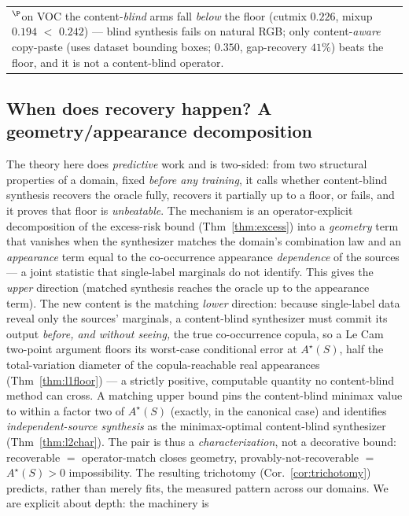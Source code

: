 \documentclass[11pt]{article}
\begin{document}
\begin{table}[t]
\begin{tabular}{lcccc}
\multicolumn{5}{l}{\footnotesize $^{\P}$on VOC the content-\emph{blind} arms fall \emph{below} the floor (cutmix $0.226$, mixup $0.194$ $<$ $0.242$) --- blind synthesis fails on natural RGB; only content-\emph{aware} copy-paste (uses dataset bounding boxes; $0.350$, gap-recovery $41\%$) beats the floor, and it is not a content-blind operator.}
\end{tabular}
\end{table}

\subsection{When does recovery happen? A geometry/appearance decomposition}\label{sec:theory}

The theory here does \emph{predictive} work and is two-sided: from two structural properties of
a domain, fixed \emph{before any training}, it calls whether content-blind synthesis recovers the
oracle fully, recovers it partially up to a floor, or fails, and it proves that floor is
\emph{unbeatable}. The mechanism is an operator-explicit decomposition of the excess-risk bound
(Thm~\ref{thm:excess}) into a \emph{geometry} term that vanishes when the synthesizer matches the
domain's combination law and an \emph{appearance} term equal to the co-occurrence appearance
\emph{dependence} of the sources --- a joint statistic that single-label marginals do not
identify. This gives the \emph{upper} direction (matched synthesis reaches the oracle up to the
appearance term). The new content is the matching \emph{lower} direction: because single-label
data reveal only the sources' marginals, a content-blind synthesizer must commit its output
\emph{before, and without seeing,} the true co-occurrence copula, so a Le Cam two-point argument
floors its worst-case conditional error at $A^\star(S)$, half the total-variation diameter of the
copula-reachable real appearances (Thm~\ref{thm:l1floor}) --- a strictly positive, computable
quantity no content-blind method can cross. A matching upper bound pins the content-blind minimax
value to within a factor two of $A^\star(S)$ (exactly, in the canonical case) and identifies
\emph{independent-source synthesis} as the minimax-optimal content-blind synthesizer
(Thm~\ref{thm:l2char}). The pair is thus a \emph{characterization}, not a decorative bound:
recoverable $=$ operator-match closes geometry, provably-not-recoverable $=$ $A^\star(S)>0$
impossibility. The resulting trichotomy (Cor.~\ref{cor:trichotomy}) predicts, rather than merely
fits, the measured pattern across our domains. We are explicit about depth: the machinery is
\end{document}

